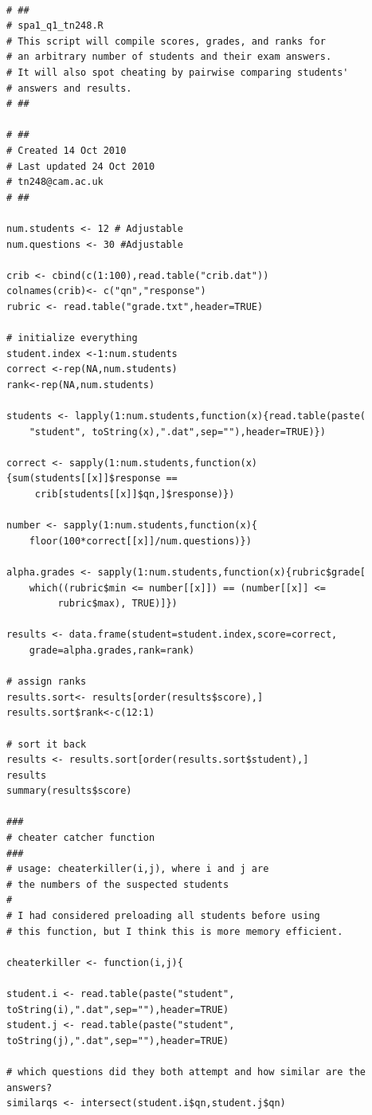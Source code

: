 \documentclass[10pt, oneside, reqno]{article}
\theoremstyle{plain}
\begin{document}
\begin{lstlisting}

# ##
# spa1_q1_tn248.R
# This script will compile scores, grades, and ranks for 
# an arbitrary number of students and their exam answers.
# It will also spot cheating by pairwise comparing students'
# answers and results.
# ##

# ##
# Created 14 Oct 2010
# Last updated 24 Oct 2010
# tn248@cam.ac.uk
# ##

num.students <- 12 # Adjustable
num.questions <- 30 #Adjustable
 
crib <- cbind(c(1:100),read.table("crib.dat"))
colnames(crib)<- c("qn","response")
rubric <- read.table("grade.txt",header=TRUE)

# initialize everything
student.index <-1:num.students
correct <-rep(NA,num.students)
rank<-rep(NA,num.students)

students <- lapply(1:num.students,function(x){read.table(paste(
	"student", toString(x),".dat",sep=""),header=TRUE)})

correct <- sapply(1:num.students,function(x){sum(students[[x]]$response ==
	 crib[students[[x]]$qn,]$response)})

number <- sapply(1:num.students,function(x){
	floor(100*correct[[x]]/num.questions)})

alpha.grades <- sapply(1:num.students,function(x){rubric$grade[
	which((rubric$min <= number[[x]]) == (number[[x]] <=
		 rubric$max), TRUE)]})

results <- data.frame(student=student.index,score=correct,
	grade=alpha.grades,rank=rank)

# assign ranks
results.sort<- results[order(results$score),]
results.sort$rank<-c(12:1)

# sort it back
results <- results.sort[order(results.sort$student),]
results
summary(results$score)

###
# cheater catcher function
###
# usage: cheaterkiller(i,j), where i and j are 
# the numbers of the suspected students
# 
# I had considered preloading all students before using 
# this function, but I think this is more memory efficient.

cheaterkiller <- function(i,j){ 
	
student.i <- read.table(paste("student", toString(i),".dat",sep=""),header=TRUE)
student.j <- read.table(paste("student", toString(j),".dat",sep=""),header=TRUE)

# which questions did they both attempt and how similar are the answers?
similarqs <- intersect(student.i$qn,student.j$qn)


\end{lstlisting}
\end{document}
